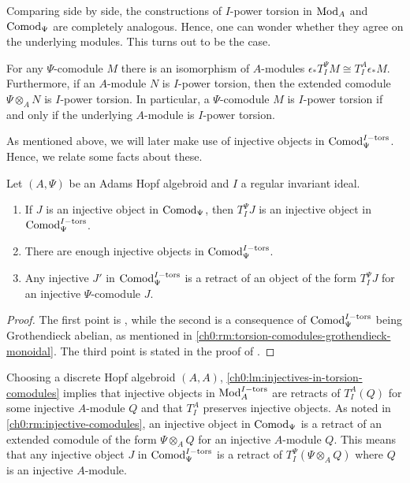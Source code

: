 Comparing side by side, the constructions of $I$-power torsion in $\mathrm{Mod}_A$ and $\mathrm{Comod}_\Psi$ are completely analogous. Hence, one can wonder whether they agree on the underlying modules. This turns out to be the case. 

\begin{lemma}
    \label{ch0:lm:torsion-comodule-iff-torsion-module}
    For any $\Psi$-comodule $M$ there is an isomorphism of $A$-modules $\epsilon_* T^\Psi_I M \cong T^A_I \epsilon_* M.$
    Furthermore, if an $A$-module $N$ is $I$-power torsion, then the extended comodule $\Psi\otimes_A N$ is $I$-power torsion. In particular, a $\Psi$-comodule $M$ is $I$-power torsion if and only if the underlying $A$-module is $I$-power torsion. 
\end{lemma}

As mentioned above, we will later make use of injective objects in $\mathrm{Comod}_\Psi^{I-\mathrm{tors}}$. Hence, we relate some facts about these. 

\begin{lemma}
    \label{ch0:lm:injectives-in-torsion-comodules}
    Let $(A, \Psi)$ be an Adams Hopf algebroid and $I$ a regular invariant ideal.
    \begin{enumerate}
        \item If $J$ is an injective object in $\mathrm{Comod}_\Psi$, then $T_I^\Psi J$ is an injective object in $\mathrm{Comod}_\Psi^{I-\mathrm{tors}}$.
        \item There are enough injective objects in $\mathrm{Comod}_\Psi^{I-\mathrm{tors}}$.
        \item Any injective $J'$ in $\mathrm{Comod}_\Psi^{I-\mathrm{tors}}$ is a retract of an object of the form $T_I^\Psi J$ for an injective $\Psi$-comodule $J$.
    \end{enumerate} 
\end{lemma}
\begin{proof}
    The first point is \cite[2.1.4]{brodmann-sharp_1998}, while the second is a consequence of $\mathrm{Comod}_\Psi^{I-\mathrm{tors}}$ being Grothendieck abelian, as mentioned in \cref{ch0:rm:torsion-comodules-grothendieck-monoidal}. The third point is stated in the proof of \cite[3.16]{barthel-heard-valenzuela_2020}. 
\end{proof}

\begin{remark}
    \label{ch0:rm:injectives-in-torsion-modules}
    Choosing a discrete Hopf algebroid $(A,A)$, \cref{ch0:lm:injectives-in-torsion-comodules} implies that injective objects in $\mathrm{Mod}_A^{I-\mathrm{tors}}$ are retracts of $T_I^A(Q)$ for some injective $A$-module $Q$ and that $T_I^A$ preserves injective objects. As noted in \cref{ch0:rm:injective-comodules}, an injective object in $\mathrm{Comod}_\Psi$ is a retract of an extended comodule of the form $\Psi\otimes_A Q$ for an injective $A$-module $Q$. This means that any injective object $J$ in $\mathrm{Comod}_\Psi^{I-\mathrm{tors}}$ is a retract of $T_I^\Psi(\Psi\otimes_A Q)$ where $Q$ is an injective $A$-module. 
\end{remark}

